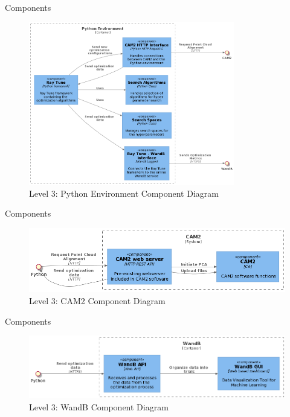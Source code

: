 \documentclass[10pt]{beamer}
\begin{document}
  \begin{frame}{Components}
    \begin{figure}[H]
    \centering
    \includegraphics[width=0.8\textwidth]{images/c3_python.png}
    \caption*{Level 3: Python Environment Component Diagram}
    \label{fig:l3_python}
    \end{figure}
  \end{frame}
  \begin{frame}{Components}
    \begin{figure}[H]
    \centering
    \includegraphics[width=\textwidth]{images/c3_cam2.png}
    \caption*{Level 3: CAM2 Component Diagram}
    \label{fig:l3_cam2}
    \end{figure}
  \end{frame}
  \begin{frame}{Components}
    \begin{figure}[H]
    \centering
    \includegraphics[width=\textwidth]{images/c3_wandb.png}
    \caption*{Level 3: WandB Component Diagram}
    \label{fig:l3_wandb}
    \end{figure}
  \end{frame}
\end{document}
